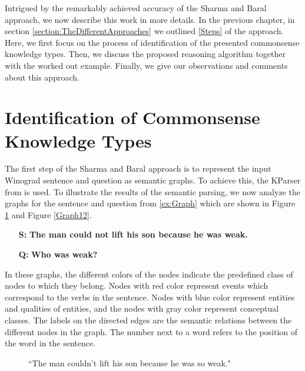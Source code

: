 
Intrigued by the remarkably achieved accuracy of the Sharma and Baral \cite{2018CommonsenseKT} approach, we now describe this work in more details. In the previous chapter, in section \ref{section:TheDifferentApproaches} we outlined \ref{Steps} of the approach. Here, we first focus on the process of identification of the presented commonsense knowledge types. Then, we discuss the proposed reasoning algorithm together with the worked out example. Finally, we give our observations and comments about this approach.


\section{Identification of Commonsense Knowledge Types}
The first step of the Sharma and Baral \cite{2018CommonsenseKT} approach is to represent the input Winograd sentence and question as semantic graphs. To achieve this, the KParser from \cite{DBLP:conf/ijcai/SharmaVAB15} is used. 
To illustrate the results of the semantic parsing, we now analyze the graphs for the sentence and question from \ref{ex:Graph} which are shown in Figure \ref{Graph11} and Figure \ref{Graph12}. \\ 
\begin{itemize}
	\item[\textbf{S:}] \textbf{The man could not lift his son because he was weak.}
	\item[\textbf{Q:}] \textbf{Who was weak?}
\end{itemize}

In these graphs, the different colors of the nodes indicate the predefined class of nodes to which they belong. 
Nodes with red color represent events which correspond to the verbs in the sentence. Nodes with blue color represent entities and qualities of entities, and the nodes with gray color represent conceptual classes. The labels on the directed edges are the semantic relations between the different nodes in the graph. The number next to a word refers to the position of the word in the sentence. 
\begin{figure}
	\centering
	
	\caption{\label{Graph11}``The man couldn't lift his son because he was so weak."}
\end{figure}


